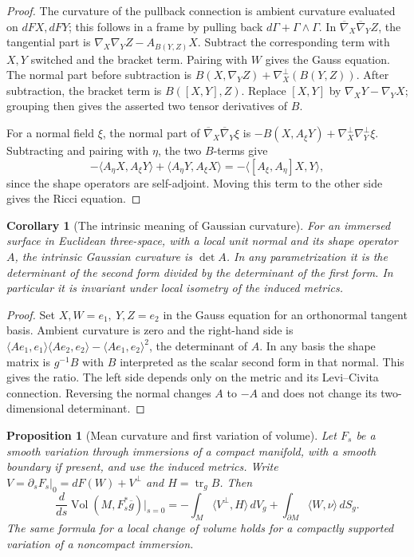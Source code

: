 \documentclass[11pt,oneside,openany]{book}
\theoremstyle{plain}
\newtheorem{proposition}[theorem]{Proposition}
\newtheorem{corollary}[theorem]{Corollary}
\theoremstyle{definition}
\theoremstyle{remark}
\begin{document}
\begin{proof}
The curvature of the pullback connection is ambient curvature
evaluated on \(dF X,dF Y\); this follows in a frame by pulling
back \(d\Gamma+\Gamma\wedge\Gamma\).
In \(\overline\nabla_X\overline\nabla_YZ\), the tangential
part is \(\nabla_X\nabla_Y Z-A_{B(Y,Z)}X\).
Subtract the corresponding term with \(X,Y\) switched and the
bracket term. Pairing with \(W\) gives the Gauss equation.
The normal part before subtraction is
\(B(X,\nabla_YZ)+\nabla_X^\perp(B(Y,Z))\).
After subtraction, the bracket term is \(B([X,Y],Z)\).
Replace \([X,Y]\) by \(\nabla_XY-\nabla_YX\); grouping then
gives the asserted two tensor derivatives of \(B\).

For a normal field \(\xi\), the normal part of
\(\overline\nabla_X\overline\nabla_Y\xi\) is
\(-B(X,A_\xi Y)+\nabla_X^\perp\nabla_Y^\perp\xi\).
Subtracting and pairing with \(\eta\), the two \(B\)-terms
give
\[
 -\langle A_\eta X,A_\xi Y\rangle+
        \langle A_\eta Y,A_\xi X\rangle
    =-\langle[A_\xi,A_\eta]X,Y\rangle,
\]
since the shape operators are self-adjoint. Moving this term
to the other side gives the Ricci equation.
\end{proof}

\begin{corollary}[The intrinsic meaning of Gaussian curvature]
\label{cor:p202-egregium}
For an immersed surface in Euclidean three-space, with a local
unit normal and its shape operator \(A\), the intrinsic Gaussian
curvature is \(\det A\). In any parametrization it is the
determinant of the second form divided by the determinant of the
first form. In particular it is invariant under local isometry
of the induced metrics.
\end{corollary}

\begin{proof}
Set \(X,W=e_1,\ Y,Z=e_2\) in the Gauss equation for an orthonormal
tangent basis. Ambient curvature is zero and the right-hand side
is \(\langle A e_1,e_1\rangle\langle A e_2,e_2\rangle-
\langle A e_1,e_2\rangle^2\), the determinant of \(A\).
In any basis the shape matrix is \(g^{-1}B\) with \(B\) interpreted
as the scalar second form in that normal. This gives the ratio.
The left side depends only on the metric and its Levi--Civita
connection. Reversing the normal changes \(A\) to \(-A\) and does
not change its two-dimensional determinant.
\end{proof}

\begin{proposition}[Mean curvature and first variation of volume]
\label{prop:p202-volume-variation}
Let \(F_s\) be a smooth variation through immersions of a compact
manifold, with a smooth boundary if present, and use the induced
metrics. Write \(V=\partial_s F_s|_0=dF(W)+V^\perp\) and
\(H=\operatorname{tr}_g B\). Then
\[
 \frac{d}{ds}\operatorname{Vol}(M,F_s^*\overline g)\bigg|_{s=0}
 =-\int_M\langle V^\perp,H\rangle\,dV_g+
                    \int_{\partial M}\langle W,\nu\rangle\,dS_g .
\]
The same formula for a local change of volume holds for a compactly
supported variation of a noncompact immersion.
\end{proposition}
\end{document}
